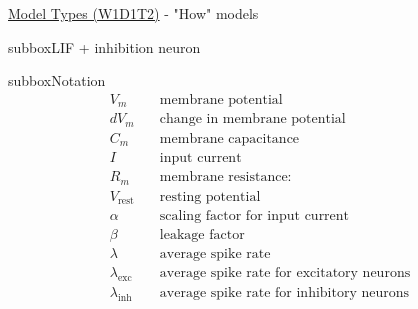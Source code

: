 \begin{textbox}{\href{https://compneuro.neuromatch.io/tutorials/W1D1_ModelTypes/student/W1D1_Tutorial2.html}{Model Types (W1D1T2)} -  "How" models}
\begin{subbox}{subbox}{LIF + inhibition neuron}
\end{subbox}
\begin{subbox}{subbox}{Notation}
\scriptsize
\begin{align*}
V_m &\quad \text{membrane potential} \\
dV_m &\quad \text{change in membrane potential}\\
C_m &\quad \text{membrane capacitance}\\
I &\quad \text{input current}\\
R_m &\quad \text{membrane resistance}:\\
V_\mathrm{rest} &\quad \text{resting potential}\\
\alpha &\quad \text{scaling factor for input current}\\
\beta &\quad \text{leakage factor}\\
\lambda &\quad \text{average spike rate}\\
\lambda_\mathrm{exc} &\quad \text{average spike rate for excitatory neurons}\\
\lambda_\mathrm{inh} &\quad \text{average spike rate for inhibitory neurons}\\
\end{align*}
\end{subbox}
\end{textbox}
